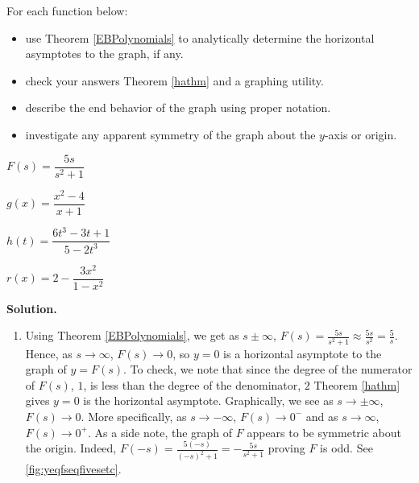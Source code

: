 \begin{ex} \label{haexample} For each function below:

\begin{itemize}

\item use Theorem \ref{EBPolynomials} to  analytically determine the horizontal asymptotes to the graph, if any.

\item check your answers Theorem \ref{hathm} and a graphing utility.   

\item describe the end behavior of the graph using proper notation.

\item  investigate any apparent symmetry of the graph about the $y$-axis or origin.

\end{itemize}

\begin{shortenumerate}[MMMMMMM]
\item $F(s) = \dfrac{5s}{s^2+1}$  
\item  $g(x) = \dfrac{x^2-4}{x+1}$ 
\item  $h(t) = \dfrac{6t^3-3t+1}{5-2t^3}$
\item  $r(x) = 2 - \dfrac{3x^2}{1-x^2}$ 
\end{shortenumerate}

{ \bf Solution.}

\begin{enumerate}

\item  Using  Theorem \ref{EBPolynomials}, we get as $s \pm \infty$, $F(s) = \frac{5s}{s^2+1}  \approx \frac{5s}{s^2} = \frac{5}{s}$.  Hence, as $s \rightarrow \infty$, $F(s) \rightarrow 0$, so $y = 0$ is a horizontal asymptote to the graph of $y = F(s)$.  To check, we note that since the degree of the  numerator of $F(s)$,  $1$, is less than the degree of the denominator, $2$ Theorem \ref{hathm} gives  $y=0$ is the horizontal asymptote.  Graphically, we see as  $s \rightarrow  \pm \infty$, $F(s) \rightarrow 0$.  More specifically, as $s \rightarrow -\infty$, $F(s)  \rightarrow 0^{-}$ and as $s \rightarrow \infty$, $F(s)  \rightarrow 0^{+}$.  As a side note, the graph of $F$ appears to be symmetric about the origin.  Indeed, $F(-s) = \frac{5(-s)}{(-s)^2+1} = -\frac{5s}{s^2+1}$ proving $F$ is odd. See \autoref{fig:yeqfseqfivesetc}.


\end{enumerate}
\end{ex}
